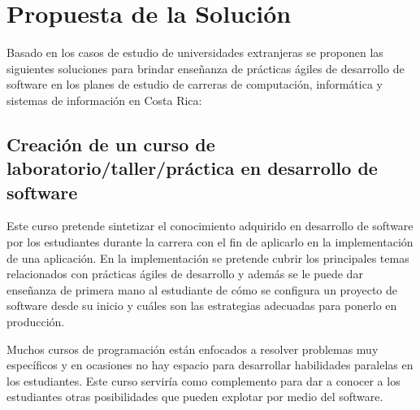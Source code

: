 \section{Propuesta de la Solución}
Basado en los casos de estudio de universidades extranjeras se proponen las siguientes soluciones para brindar enseñanza de prácticas ágiles de desarrollo de software en los planes de estudio de carreras de computación, informática y sistemas de información en Costa Rica:

\subsection{Creación de un curso de laboratorio/taller/práctica en desarrollo de software}
Este curso pretende sintetizar el conocimiento adquirido en desarrollo de software por los estudiantes durante la carrera con el fin de aplicarlo en la implementación de una aplicación. En la implementación se pretende cubrir los principales temas relacionados con prácticas ágiles de desarrollo y además se le puede dar enseñanza de primera mano al estudiante de cómo se configura un proyecto de software desde su inicio y cuáles son las estrategias adecuadas para ponerlo en producción.

Muchos cursos de programación están enfocados a resolver problemas muy específicos y en ocasiones no hay espacio para desarrollar habilidades paralelas en los estudiantes. Este curso serviría como complemento para dar a conocer a los estudiantes otras posibilidades que pueden explotar por medio del software.

